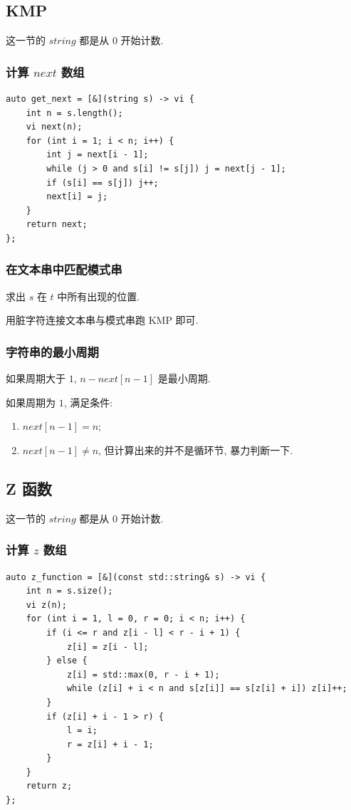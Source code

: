 \documentclass[UTF8, a4paper, titlepage, twoside]{ctexart}
\begin{document}
\subsection{ KMP }

这一节的 $string$ 都是从 $0$ 开始计数. 

\subsubsection{ 计算 $next$ 数组 }
\begin{lstlisting}
auto get_next = [&](string s) -> vi {
    int n = s.length();
    vi next(n);
    for (int i = 1; i < n; i++) {
        int j = next[i - 1];
        while (j > 0 and s[i] != s[j]) j = next[j - 1];
        if (s[i] == s[j]) j++;
        next[i] = j;
    }
    return next;
};
\end{lstlisting}

\subsubsection{ 在文本串中匹配模式串 }
求出 $s$ 在 $t$ 中所有出现的位置.

用脏字符连接文本串与模式串跑 KMP 即可.

\subsubsection{ 字符串的最小周期 }

如果周期大于 $1$, $n - next[n-1]$ 是最小周期.

如果周期为 $1$, 满足条件:

\begin{enumerate}
	\item $next[n-1] = n$;
	\item $next[n-1] \neq n$, 但计算出来的并不是循环节, 暴力判断一下.
\end{enumerate}

\subsection{ Z 函数 }

这一节的 $string$ 都是从 $0$ 开始计数. 

\subsubsection{ 计算 $z$ 数组 }
\begin{lstlisting}[style=cpp]
auto z_function = [&](const std::string& s) -> vi {
    int n = s.size();
    vi z(n);
    for (int i = 1, l = 0, r = 0; i < n; i++) {
        if (i <= r and z[i - l] < r - i + 1) {
            z[i] = z[i - l];
        } else {
            z[i] = std::max(0, r - i + 1);
            while (z[i] + i < n and s[z[i]] == s[z[i] + i]) z[i]++;
        }
        if (z[i] + i - 1 > r) {
            l = i;
            r = z[i] + i - 1;
        }
    }
    return z;
};
\end{lstlisting}
\end{document}
